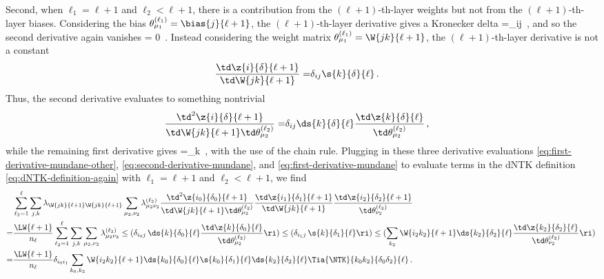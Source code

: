 Second, when $\ell_1=\ell+1$ and $\ell_2 < \ell +1$, there is a contribution from the $(\ell+1)$-th-layer weights but not from the $(\ell+1)$-th-layer biases. Considering the bias $\theta_{\mu_1}^{(\ell_1)}=\bias{j}{\ell+1}$, the $(\ell+1)$-th-layer derivative gives a Kronecker delta
\be
{}=\delta_{ij}\, ,
\ee
and so the second derivative again vanishes
\be
{}= 0\, .
\ee
Instead considering the weight matrix $\theta_{\mu_1}^{(\ell_1)}=\W{jk}{\ell+1}$, the $(\ell+1)$-th-layer derivative is not a constant
\begin{align}\label{eq:first-derivative-mundane-other}
\frac{\td \z{i}{\delta}{\ell+1}}{\td \W{jk}{\ell+1}}=&\delta_{ij}\s{k}{\delta}{\ell}\, .
\end{align}
Thus, the second derivative evaluates to something nontrivial
\begin{align}\label{eq:second-derivative-mundane}
\frac{\td^2 \z{i}{\delta}{\ell+1}}{\td \W{jk}{\ell+1}\td \theta_{\mu_2}^{(\ell_2)}}=&\delta_{ij}\ds{k}{\delta}{\ell}\frac{\td \z{k}{\delta}{\ell}}{\td \theta_{\mu_2}^{(\ell_2)}}\, ,
\end{align}
while the remaining first derivative
gives
\be
{}=\sum_{k}\, ,\label{eq:first-derivative-mundane}
\ee
with the use of the chain rule.
Plugging in these three derivative evaluations \eqref{eq:first-derivative-mundane-other}, \eqref{eq:second-derivative-mundane}, and \eqref{eq:first-derivative-mundane} to evaluate terms in the dNTK definition \eqref{eq:dNTK-definition-again} with $\ell_1=\ell+1$ and $\ell_2< \ell+1$, we find
\begin{align}\label{eq:dNTK-mid-one-final-layer-term}
&\sum_{\ell_2=1}^\ell \sum_{j,k}\lambda_{\W{jk}{\ell+1} \W{j k}{\ell+1}}\sum_{\mu_2,\nu_2} \lambda_{\mu_2\nu_2}^{(\ell_2)}\frac{\td^2 \z{i_0}{\delta_0}{\ell+1}}{\td \W{jk}{\ell+1}\td \theta_{\mu_2}^{(\ell_2)}}\frac{\td \z{i_1}{\delta_1}{\ell+1}}{\td \W{jk}{\ell+1}}\frac{\td \z{i_2}{\delta_2}{\ell+1}}{\td \theta_{\nu_2}^{(\ell_2)}}\, \notag \\
=&\frac{\LW{\ell+1}}{n_{\ell}}\sum_{\ell_2=1}^\ell\sum_{j,k}\sum_{\mu_2,\nu_2} \lambda_{\mu_2\nu_2}^{(\ell_2)}\le(\delta_{i_0j}\, \ds{k}{\delta_0}{\ell}\frac{\td \z{k}{\delta_0}{\ell}}{\td \theta_{\mu_2}^{(\ell_2)}}\ri)\le(\delta_{i_1j}\,\s{k}{\delta_1}{\ell}\ri)\le(\sum_{k_2}\W{i_2k_2}{\ell+1}\ds{k_2}{\delta_2}{\ell}\frac{\td \z{k_2}{\delta_2}{\ell}}{\td \theta_{\nu_2}^{(\ell_2)}}\ri)\, \notag\\
=&\frac{\LW{\ell+1}}{n_{\ell}}\delta_{i_0i_1}\sum_{k_0,k_2}\W{i_2k_2}{\ell+1}\ds{k_0}{\delta_0}{\ell}\s{k_0}{\delta_1}{\ell}\ds{k_2}{\delta_2}{\ell}\Tia{\NTK}{k_0k_2}{\delta_0\delta_2}{\ell}\, .
\end{align}
